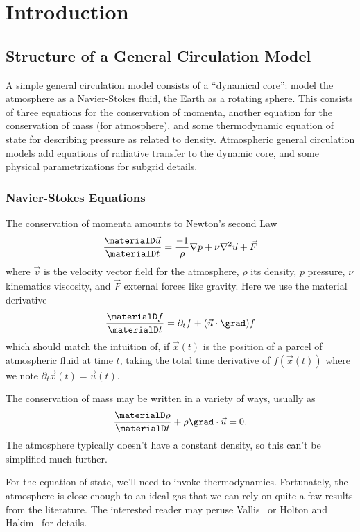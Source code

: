 \chapter{Introduction}

\section{Structure of a General Circulation Model}

A simple general circulation model consists of a ``dynamical core'':
model the atmosphere as a Navier-Stokes fluid, the Earth as a rotating
sphere. This consists of three equations for the conservation of
momenta, another equation for the conservation of mass (for atmosphere),
and some thermodynamic equation of state for describing pressure as
related to density. Atmospheric general circulation models add equations
of radiative transfer to the dynamic core, and some physical
parametrizations for subgrid details.

\subsection{Navier-Stokes Equations}

The conservation of momenta amounts to Newton's second Law
\begin{equation}
  \frac{\materialD\vec{u}}{\materialD t}
  =\frac{-1}{\rho}\nabla p + \nu\nabla^{2}\vec{u} + \vec{F}
\end{equation}
where $\vec{v}$ is the velocity vector field for the atmosphere, $\rho$
its density, $p$ pressure, $\nu$ kinematics viscosity, and $\vec{F}$
external forces like gravity. Here we use the material derivative
\begin{equation}
  \frac{\materialD f}{\materialD t} = \partial_{t}f + (\vec{u}\cdot\grad)f
\end{equation}
which should match the intuition of, if $\vec{x}(t)$ is the position of
a parcel of atmospheric fluid at time $t$, taking the total time
derivative of $f(\vec{x}(t))$ where we note
$\partial_{t}\vec{x}(t)=\vec{u}(t)$.

The conservation of mass may be written in a variety of ways, usually as
\begin{equation}
  \frac{\materialD\rho}{\materialD t}+\rho\grad\cdot\vec{u}=0.
\end{equation}
The atmosphere typically doesn't have a constant density, so this can't
be simplified much further.

For the equation of state, we'll need to invoke thermodynamics.
Fortunately, the atmosphere is close enough to an ideal gas that we can
rely on quite a few results from the literature. The interested reader
may peruse Vallis~\cite{vallis_2017} or Holton and
Hakim~\cite{holton2013dynamicMeteorology} for details.

